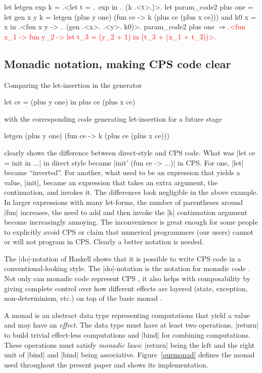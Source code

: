 \documentclass{elsart}
\newcommand{\evalresult}[1]{\ensuremath{\Longrightarrow}\textcolor{red}{#1}}
\begin{document}
\begin{code}[commandchars=\\\{\}]
let letgen exp k = .<let t = .~exp in .~(k .<t>.)>.
let param_code2 plus one =
  let gen x y k = letgen (plus y one)
                         (fun ce -> k (plus ce (plus x ce)))
  and k0 x = x
  in .<fun x y -> .~(gen .<x>. .<y>. k0)>.
param_code2 plus one
\evalresult{.<fun x_1 -> fun y_2 -> let t_3 = (y_2 + 1) in (t_3 + (x_1 + t_3))>.}
\end{code}

\subsection{Monadic notation, making CPS code clear}\label{monadicnotation}

Comparing the let-insertion in the generator
\begin{code}
let ce = (plus y one) in  plus ce (plus x ce)
\end{code}
with the corresponding code generating let-insertion for a future
stage
\begin{code}
letgen (plus y one) (fun ce -> k (plus ce (plus x ce)))
\end{code}
clearly shows the difference between  direct-style and CPS code.
What was |let ce = init in ...| in direct style became
|init' (fun ce -> ...)| in CPS. For one, |let| became
``inverted''. For another, what used to be an expression that yields
a value, |init|, became an expression that takes an extra argument,
the continuation, and invokes it. The differences look negligible in
the above example. In larger expressions with many let-forms, the
number of parentheses around |fun| increases, the need to add and
then invoke the |k| continuation argument become increasingly annoying. The
inconvenience is great enough for some people to explicitly avoid CPS
or claim that numerical programmers (our users) cannot or will not
program in CPS. Clearly a better notation is needed.

The |do|-notation of Haskell \cite{Haskell98Report} shows that it is possible
to write CPS code in a conventional-looking style. The
|do|-notation is the notation for monadic code \cite{moggi-notions}.
Not only can monadic code represent CPS \cite{Filinski:Representing},
it also helps with composability by giving complete control over how
different effects are layered
(state, exception, non-determinism, etc.) on top of the
basic monad \cite{liang-interpreter}.

A monad \cite{moggi-notions} is an abstract data type representing
computations that yield a value and may have an \emph{effect}.
The data type must have at least two operations, |return| to build
trivial effect-less computations and |bind| for combining
computations. These operations must satisfy \emph{monadic laws}:
|return| being the left and the right unit of |bind| and |bind| being
associative. Figure~\ref{ourmonad} defines the monad used throughout
the present paper and shows its implementation.
\end{document}
